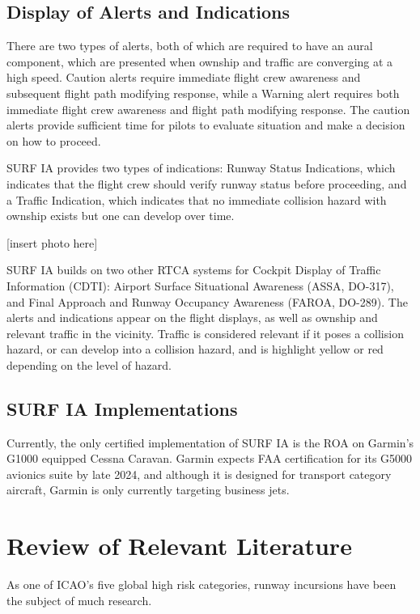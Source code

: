\subsection{Display of Alerts and Indications}


There are two types of alerts, both of which are required to have an aural component, which are presented when ownship and traffic are converging at a high speed. Caution alerts require immediate flight crew awareness and subsequent flight path modifying response, while a Warning alert requires both immediate flight crew awareness and flight path modifying response. The caution alerts provide sufficient time for pilots to evaluate situation and make a decision on how to proceed.

SURF IA provides two types of indications: Runway Status Indications, which indicates that the flight crew should verify runway status before proceeding, and a Traffic Indication, which indicates that no immediate collision hazard with ownship exists but one can develop over time.

[insert photo here]

SURF IA builds on two other RTCA systems for Cockpit Display of Traffic Information (CDTI): Airport Surface Situational Awareness (ASSA, DO-317), and Final Approach and Runway Occupancy Awareness (FAROA, DO-289). The alerts and indications appear on the flight displays, as well as ownship and relevant traffic in the vicinity. Traffic is considered relevant if it poses a collision hazard, or can develop into a collision hazard, and is highlight yellow or red depending on the level of hazard.

\subsection{SURF IA Implementations}

Currently, the only certified implementation of SURF IA is the ROA on Garmin's G1000 equipped Cessna Caravan. Garmin expects FAA certification for its G5000 avionics suite by late 2024, and although it is designed for transport category aircraft, Garmin is only currently targeting business jets.

\section{Review of Relevant Literature}

As one of ICAO's five global high risk categories, runway incursions have been the subject of much research.


